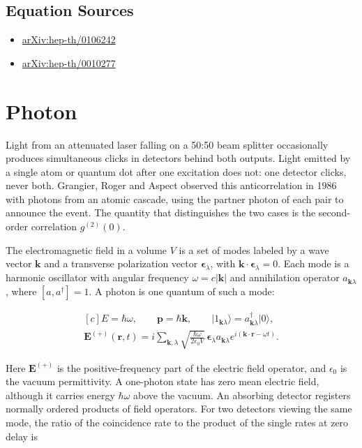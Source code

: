 \documentclass[11pt,oneside]{book}
\newenvironment{centeredalign}{\[\begin{gathered}[c]}{\end{gathered}\]}
\newcommand{\ket}[1]{\lvert #1\rangle}
\begin{document}
\subsection*{Equation Sources}
\begin{itemize}
\item \href{https://arxiv.org/abs/hep-th/0106242}{arXiv:hep-th/0106242}
\item \href{https://arxiv.org/abs/hep-th/0010277}{arXiv:hep-th/0010277}
\end{itemize}

\clearpage

\section{Photon}

\label{topic:photon}

Light from an attenuated laser falling on a 50:50 beam splitter occasionally produces simultaneous clicks in detectors behind both outputs. Light emitted by a single atom or quantum dot after one excitation does not: one detector clicks, never both. Grangier, Roger and Aspect observed this anticorrelation in 1986 with photons from an atomic cascade, using the partner photon of each pair to announce the event. The quantity that distinguishes the two cases is the second-order correlation \(g^{(2)}(0)\).

The electromagnetic field in a volume \(V\) is a set of modes labeled by a wave vector \(\mathbf k\) and a transverse polarization vector \(\boldsymbol\epsilon_\lambda\), with \(\mathbf k\cdot\boldsymbol\epsilon_\lambda=0\). Each mode is a harmonic oscillator with angular frequency \(\omega=c|\mathbf k|\) and annihilation operator \(a_{\mathbf k\lambda}\), where \([a,a^\dagger]=1\). A photon is one quantum of such a mode:

\begin{centeredalign}
E=\hbar\omega,\qquad \mathbf p=\hbar\mathbf k,\qquad
\ket{1_{\mathbf k\lambda}}=a_{\mathbf k\lambda}^\dagger\ket{0},\\
\mathbf E^{(+)}(\mathbf r,t)=i\sum_{\mathbf k,\lambda}\sqrt{\frac{\hbar\omega}{2\epsilon_0V}}\,
\boldsymbol\epsilon_\lambda a_{\mathbf k\lambda}e^{i(\mathbf k\cdot\mathbf r-\omega t)}.
\end{centeredalign}

Here \(\mathbf E^{(+)}\) is the positive-frequency part of the electric field operator, and \(\epsilon_0\) is the vacuum permittivity. A one-photon state has zero mean electric field, although it carries energy \(\hbar\omega\) above the vacuum. An absorbing detector registers normally ordered products of field operators. For two detectors viewing the same mode, the ratio of the coincidence rate to the product of the single rates at zero delay is
\end{document}
